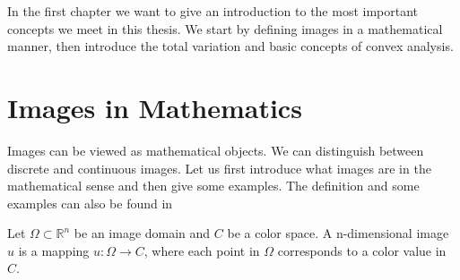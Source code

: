 In the first chapter we want to give an introduction to the most important concepts we meet in this thesis. We start by defining images in a mathematical manner, then introduce the total variation and basic concepts of convex analysis.

\section{Images in Mathematics} %
\label{sec:images_in_mathematics}

    Images can be viewed as mathematical objects. We can distinguish between discrete and continuous images. Let us first introduce what images are in the mathematical sense and then give some examples. The definition and some examples can also be found in \cite{Bredies}

    \begin{definition}[Image] %
    \label{def:image}

        Let $\Omega \subset \mathbb{R}^{n}$ be an image domain and $C$ be a color space. A n-dimensional image $u$ is a mapping $u: \Omega \longrightarrow C$, where each point in $\Omega$ corresponds to a color value in $C$.

    \end{definition}

